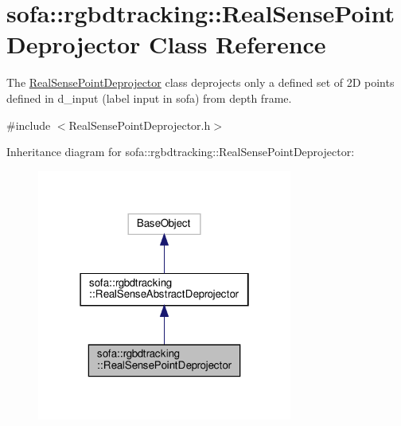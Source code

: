\hypertarget{classsofa_1_1rgbdtracking_1_1_real_sense_point_deprojector}{}\section{sofa\+:\+:rgbdtracking\+:\+:Real\+Sense\+Point\+Deprojector Class Reference}
\label{classsofa_1_1rgbdtracking_1_1_real_sense_point_deprojector}


The \hyperlink{classsofa_1_1rgbdtracking_1_1_real_sense_point_deprojector}{Real\+Sense\+Point\+Deprojector} class deprojects only a defined set of 2D points defined in d\+\_\+input (label input in sofa) from depth frame.  




{\ttfamily \#include $<$Real\+Sense\+Point\+Deprojector.\+h$>$}



Inheritance diagram for sofa\+:\+:rgbdtracking\+:\+:Real\+Sense\+Point\+Deprojector\+:
\nopagebreak
\begin{figure}[H]
\begin{center}
\leavevmode
\includegraphics[width=238pt]{classsofa_1_1rgbdtracking_1_1_real_sense_point_deprojector__inherit__graph}
\end{center}
\end{figure}


